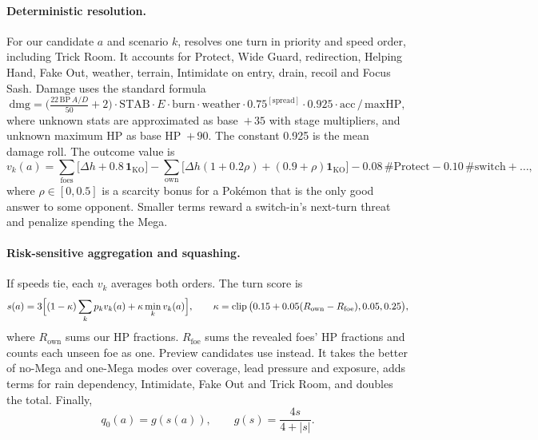 \paragraph{Deterministic resolution.}
For our candidate $a$ and scenario $k$,  resolves one turn in
priority and speed order, including Trick Room. It accounts for Protect, Wide
Guard, redirection, Helping Hand, Fake Out, weather, terrain, Intimidate on
entry, drain, recoil and Focus Sash. Damage uses the standard formula
\begin{equation}
  \text{dmg}=\Big(\tfrac{22\,\mathrm{BP}\,A/D}{50}+2\Big)\cdot\mathrm{STAB}\cdot E\cdot
  \text{burn}\cdot\text{weather}\cdot0.75^{[\text{spread}]}\cdot0.925\cdot\text{acc}\,/\,\text{maxHP},
\end{equation}
where unknown stats are approximated as base~$+\,35$ with stage multipliers, and
unknown maximum HP as base HP~$+\,90$. The constant 0.925 is the mean damage
roll. The outcome value is
\begin{equation}
  v_k(a)=\sum_{\text{foes}}\big[\Delta h+0.8\,\mathbf 1_{\mathrm{KO}}\big]
  -\sum_{\text{own}}\big[\Delta h(1+0.2\rho)+(0.9+\rho)\mathbf 1_{\mathrm{KO}}\big]
  -0.08\,\#\text{Protect}-0.10\,\#\text{switch}+\dots,
\end{equation}
where $\rho\in[0,0.5]$ is a scarcity bonus for a Pok\'{e}mon that is the only
good answer to some opponent. Smaller terms reward a switch-in's next-turn
threat and penalize spending the Mega.

\paragraph{Risk-sensitive aggregation and squashing.}
If speeds tie, each $v_k$ averages both orders. The turn score is
\begin{equation}
  s(a)=3\Big[(1-\kappa)\sum_kp_kv_k(a)+\kappa\min_kv_k(a)\Big],\qquad
  \kappa=\operatorname{clip}\big(0.15+0.05(R_{\mathrm{own}}-R_{\mathrm{foe}}),0.05,0.25\big),
  \label{eq:turnscore}
\end{equation}
where $R_{\mathrm{own}}$ sums our HP fractions. $R_{\mathrm{foe}}$ sums the
revealed foes' HP fractions and counts each unseen foe as one. Preview
candidates use  instead. It takes the better of no-Mega
and one-Mega modes over coverage, lead pressure and exposure, adds terms for
rain dependency, Intimidate, Fake Out and Trick Room, and doubles the total.
Finally,
\begin{equation}
  q_0(a)=g(s(a)),\qquad g(s)=\frac{4s}{4+|s|}.
  \label{eq:squash}
\end{equation}

